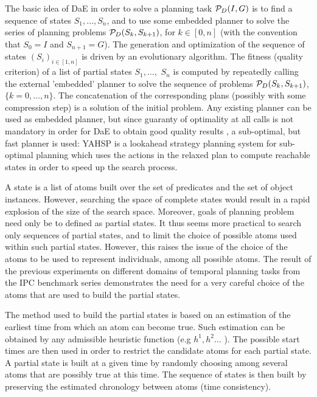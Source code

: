 \documentclass[runningheads,a4paper]{llncs}
\begin{document}
The basic idea of DaE in order to solve a planning task ${\cal P}_D(I,G)$ is to find a sequence of states $S_1, \ldots, S_n$, and to use some embedded planner to solve the series of planning problems ${\cal P}_D(S_{k},S_{k+1})$, for $k \in [0,n]$ (with the convention that $S_0 = I$ and $S_{n+1} = G$). The generation and optimization of the sequence of states $(S_i)_{i \in [1,n]}$ is driven by an evolutionary algorithm. 
The fitness (quality criterion) of a list of partial states $S_1, \ldots,$ $S_n$ is computed by repeatedly calling the external 'embedded' planner to solve the sequence of problems ${\cal P}_D(S_{k},S_{k+1})$, $\{k=0,\ldots,n\}$. The concatenation of the corresponding plans (possibly with some compression step) is a solution of the initial problem.
Any existing planner can be used as embedded planner, but since guaranty of optimality at all calls is not mandatory in order for DaE to obtain good quality results \cite{Bibai:ICAPS2010}, a sub-optimal, but fast planner is used: YAHSP \cite{V:icaps04} is a lookahead strategy planning system for sub-optimal planning which uses the  actions in the relaxed plan to compute reachable states in order to speed up the search process. 

A state is a list of atoms built over the set of predicates and the set of object instances. However, searching the space of complete states would result in a rapid explosion of the size of the search space. Moreover, goals of planning problem need only be to defined as partial states. It thus seems more practical to search only sequences of partial states, and to limit the choice of possible atoms used within such partial states. However, this raises the issue of the choice of the atoms to be used to represent individuals, among all possible atoms. The result of the previous experiments on different domains of temporal planning tasks from the IPC benchmark series \cite{BibEvoCop2009} demonstrates the need for a very careful choice of the atoms that are used to build the partial states. 

The method used to build the partial states is based on an estimation of the earliest time from which an atom can become true. Such estimation can be obtained by any admissible heuristic function (e.g $h^1,h^2...$ \cite{HaslumGeffner-AIPS-2000}). The possible start times are then used in order to restrict the candidate atoms for each partial state. A partial state is built at a given time by randomly choosing among several atoms that are possibly true at this time. The sequence of states is then built by preserving the estimated chronology between atoms (time consistency).
\end{document}
